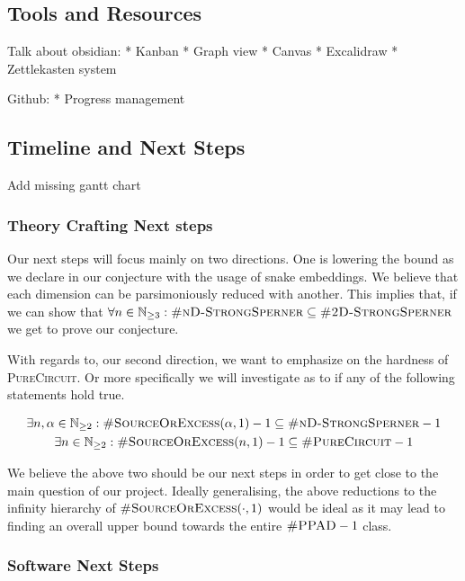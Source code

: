 \subsection{Tools and Resources}

Talk about obsidian:
* Kanban
* Graph view
* Canvas
* Excalidraw
* Zettlekasten system

Github:
* Progress management



\subsection{Timeline and Next Steps}

Add missing gantt chart


\subsubsection{Theory Crafting Next steps}

Our next steps will focus mainly on two directions. One is lowering the bound as we declare in our conjecture with the
usage of snake embeddings. We believe that each dimension can be parsimoniously reduced with another. This implies
that, if we can show that $\forall n \in \mathbb{N}_{\geq 3}: \textsc{\#nD-StrongSperner} \subseteq \textsc{\#2D-StrongSperner}$
we get to prove our conjecture.


With regards to, our second direction, we want to emphasize on the hardness of \textsc{PureCircuit}.
Or more specifically we will investigate as to if any of the following statements hold true.

\begin{gather*}
    \exists n, \alpha \in \mathbb{N}_{\geq 2}:
    \textsc{\#SourceOrExcess}(\alpha,1) - 1  \subseteq \textsc{\#nD-StrongSperner} -1 \\
    \exists n \in \mathbb{N}_{\geq 2}: \textsc{\#SourceOrExcess}(n,1) - 1 \subseteq \textsc{\#PureCircuit} -1 \\
\end{gather*}

We believe the above two should be our next steps in order to get close to the main question of our project.
Ideally generalising, the above reductions to the infinity hierarchy of
$\textsc{\#SourceOrExcess}(\cdot,1)$ would be ideal as it may lead to finding an overall upper bound
towards the entire $\textsc{\#PPAD} -1$ class.


\subsubsection{Software Next Steps}


